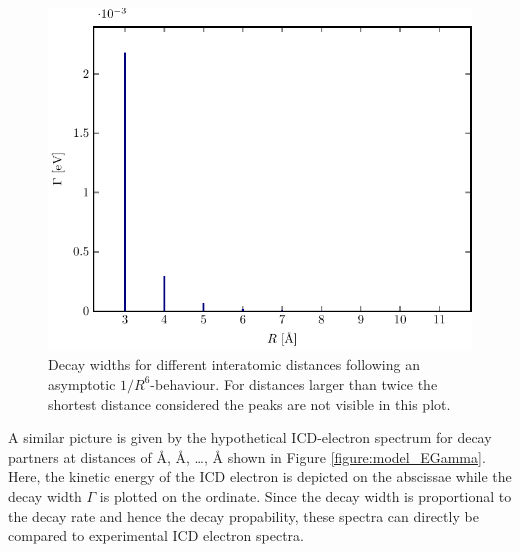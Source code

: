 \begin{figure}[h]
 \centering
 \includegraphics[width=\columnwidth]{pics/model_RGamma.pdf}
 \caption{Decay widths for different interatomic distances following an
          asymptotic $1/R^6$-behaviour. For distances larger than twice
          the shortest distance considered the peaks are not visible in this
          plot.}
 \label{figure:model_RGamma}
\end{figure}

A similar picture is given by the hypothetical ICD-electron spectrum for
decay partners at distances of \unit[3]{\AA}, \unit[4]{\AA}, \dots,
\unit[11]{\AA} shown in Figure \ref{figure:model_EGamma}. Here, the kinetic
energy of the ICD electron is depicted on the abscissae while the decay
width $\Gamma$ is plotted on the ordinate. Since the decay width is proportional
to the decay rate and hence the decay propability, these spectra can directly
be compared to experimental ICD electron spectra.

